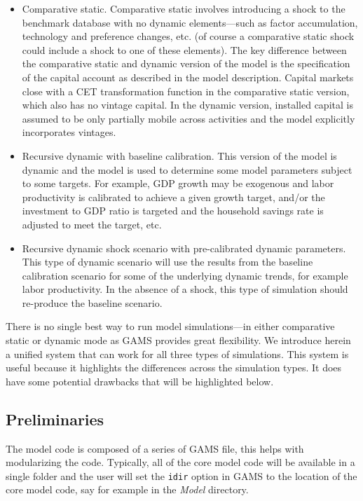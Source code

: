 \begin{itemize}
   \item Comparative static. Comparative static involves introducing a shock to
         the benchmark database with no dynamic elements---such as factor
         accumulation, technology and preference changes, etc. (of course a
         comparative static shock could include a shock to one of these
         elements). The key difference between the comparative static and
         dynamic version of the model is the specification of the capital
         account as described in the model description. Capital markets close
         with a CET transformation function in the comparative static version,
         which also has no vintage capital. In the dynamic version, installed
         capital is assumed to be only partially mobile across activities and
         the model explicitly incorporates vintages.
   \item Recursive dynamic with baseline calibration. This version of the model
         is dynamic and the model is used to determine some model parameters
         subject to some targets. For example, GDP growth may be exogenous and
         labor productivity is calibrated to achieve a given growth target,
         and/or the investment to GDP ratio is targeted and the household
         savings rate is adjusted to meet the target, etc.
   \item Recursive dynamic shock scenario with pre-calibrated dynamic
         parameters. This type of dynamic scenario will use the results from the
         baseline calibration scenario for some of the underlying dynamic
         trends, for example labor productivity. In the absence of a shock,
         this type of simulation should re-produce the baseline scenario.
\end{itemize}

There is no single best way to run model simulations---in either comparative
static or dynamic mode as GAMS provides great flexibility. We introduce herein
a unified system that can work for all three types of simulations. This system
is useful because it highlights the differences across the simulation types.
It does have some potential drawbacks that will be highlighted below.

\subsection{Preliminaries}

The model code is composed of a series of GAMS file, this helps with
modularizing the code. Typically, all of the core model code will be available
in a single folder and the user will set the \texttt{idir} option in GAMS to the
location of the core model code, say for example in the \emph{Model} directory.

